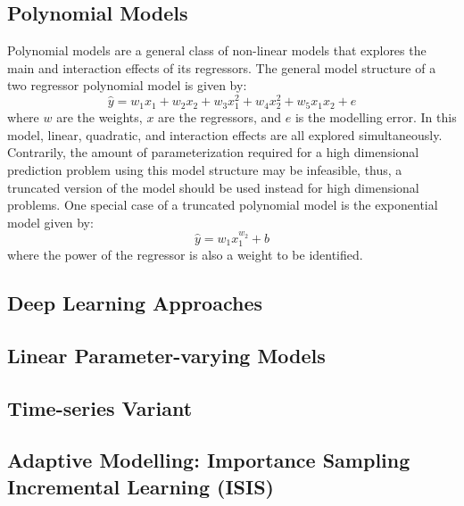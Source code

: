 \subsection{Polynomial Models}
Polynomial models are a general class of non-linear models that explores the main and interaction effects of its regressors.  The general model structure of a two regressor polynomial model is given by:
\begin{equation}
    \hat{y} = w_1x_1 + w_2x_2 + w_3x_1^2 + w_4x_2^2 + w_5x_1x_2 + e
\end{equation}
where $w$ are the weights, $x$ are the regressors, and $e$ is the modelling error.  In this model, linear, quadratic, and interaction effects are all explored simultaneously. Contrarily, the amount of parameterization required for a high dimensional prediction problem using this model structure may be infeasible, thus, a truncated version of the model should be used instead for high dimensional problems. One special case of a truncated polynomial model is the exponential model given by:
\begin{equation}
    \hat{y} = w_1 x_1^{w_2} + b
\end{equation}
where the power of the regressor is also a weight to be identified.

\subsection{Deep Learning Approaches}
\subsection{Linear Parameter-varying Models}
\subsection{Time-series Variant}
\subsection{Adaptive Modelling: Importance Sampling Incremental Learning (ISIS)}

